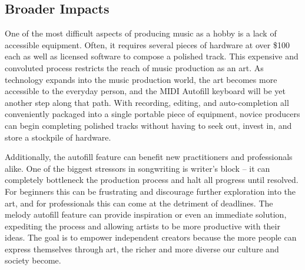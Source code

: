 \subsection{Broader Impacts}

One of the most difficult aspects of producing music as a hobby is a lack of
accessible equipment. Often, it requires several pieces of hardware at over \$100
each as well as licensed software to compose a polished track. This expensive
and convoluted process restricts the reach of music production as an art. As
technology expands into the music production world, the art becomes more
accessible to the everyday person, and the MIDI Autofill keyboard will be yet
another step along that path. With recording, editing, and auto-completion all
conveniently packaged into a single portable piece of equipment, novice
producers can begin completing polished tracks without having to seek out,
invest in, and store a stockpile of hardware.

Additionally, the autofill feature can benefit new practitioners and
professionals alike. One of the biggest stressors in songwriting is writer’s
block – it can completely bottleneck the production process and halt all
progress until resolved. For beginners this can be frustrating and discourage
further exploration into the art, and for professionals this can come at the
detriment of deadlines. The melody autofill feature can provide inspiration or
even an immediate solution, expediting the process and allowing artists to be
more productive with their ideas. The goal is to empower independent creators
because the more people can express themselves through art, the richer and more
diverse our culture and society become.